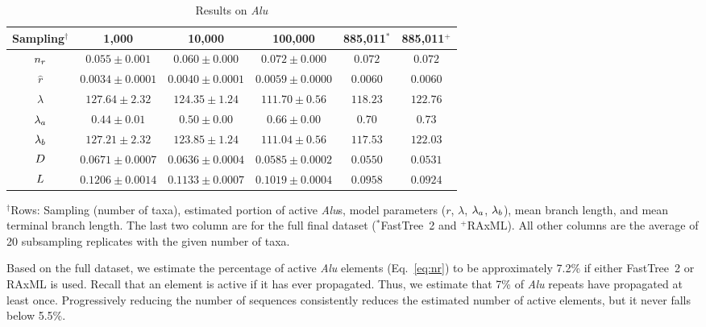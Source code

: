 \begin{table}[!ht] %
\caption[Results on \textit{Alu}]{Results on \textit{Alu}}
\vspace{-0.25in}
\begin{center}
\begin{small}
\begin{tabular}{|c|c|c|c|c|c|}
\hline
\textbf{Sampling$^\dagger$} & 1,000 & 10,000 & 100,000 & 885,011$^*$ & 885,011$^+$\\
\hline
$n_r$ & $0.055\pm0.001$ & $0.060\pm0.000$ & $0.072\pm0.000$ & $0.072$ & $0.072$\\
\hline
$\hat{r}$ & $0.0034\pm0.0001$ & $0.0040\pm0.0001$ & $0.0059\pm0.0000$ & $0.0060$ & $0.0060$\\
\hline
$\lambda$ & $127.64\pm2.32$ & $124.35\pm1.24$ & $111.70\pm0.56$ & $118.23$ & $122.76$\\
\hline
$\lambda_a$ & $0.44\pm0.01$ & $0.50\pm0.00$ & $0.66\pm0.00$ & $0.70$ & $0.73$\\
\hline
$\lambda_b$ & $127.21\pm2.32$ & $123.85\pm1.24$ & $111.04\pm0.56$ & $117.53$ & $122.03$\\
\hline
$D$ & $0.0671\pm0.0007$ & $0.0636\pm0.0004$ & $0.0585\pm0.0002$ & $0.0550$ & $0.0531$\\
\hline
$L$ & $0.1206\pm0.0014$ & $0.1133\pm0.0007$ & $0.1019\pm0.0004$ & $0.0958$ & $0.0924$\\
\hline
\end{tabular}
\end{small}
\end{center}
$^\dagger$Rows: Sampling (number of taxa), estimated portion of active {\em Alu}s, model parameters ($r$, $\lambda$, $\lambda_a$, $\lambda_b$), mean branch length, and mean terminal branch length. The last two column are for the full final dataset ($^*$FastTree~2 and $^+$RAxML). All other columns are the average of 20 subsampling replicates with the given number of taxa.
\label{tab:dualbirth-alu}
\end{table}

Based on the full dataset, we estimate the percentage of active {\em Alu} elements (Eq.~\ref{eq:nr}) to be approximately 7.2\% if either FastTree~2 or RAxML is used. Recall that an element is active if it has ever propagated. Thus, we estimate that 7\% of {\em Alu} repeats have propagated at least once. Progressively reducing the number of sequences consistently reduces the estimated number of active elements, but it never falls below 5.5\%.

